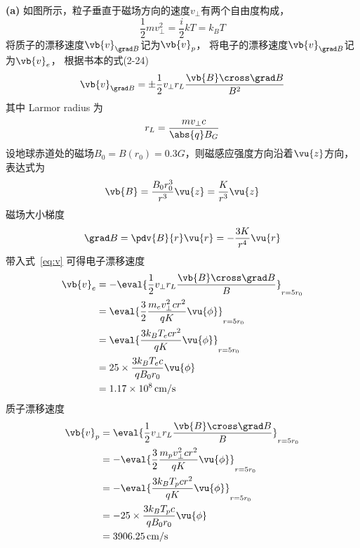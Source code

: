 \noindent \textbf{(a)} 
如图所示，粒子垂直于磁场方向的速度\(v_{\perp}\)有两个自由度构成，
\begin{equation}
  \frac{1}{2} m v_\perp^2 = \frac{i}{2}kT = k_BT
\end{equation}
将质子的漂移速度\(\vb{v}_{\grad B}\)记为\(\vb{v}_p\)，
将电子的漂移速度\(\vb{v}_{\grad B}\)记为\(\vb{v}_e\)，
根据书本的式(2-24)
\begin{equation}
  \vb{v}_{\grad B} = \pm \frac{1}{2} v_{\perp} r_L \frac{\vb{B} \cross \grad B}{B^2}
  \label{eq:v}
\end{equation}
其中 Larmor radius 为
\begin{equation}
  r_L = \frac{m v_\perp c}{\abs{q} B_G}
\end{equation}
设地球赤道处的磁场\(B_0 = B(r_0) = 0.3 \si{G}\)，则磁感应强度方向沿着\(\vu{z}\)方向，
表达式为
\begin{equation}
  \vb{B} = \frac{B_0 r_0^3}{r^3}  \vu{z}= \frac{K}{r^3} \vu{z}
\end{equation}
磁场大小梯度
\begin{equation}
  \grad B = \pdv{B}{r} \vu{r} = -\frac{3 K}{r^4} \vu{r}
\end{equation}
带入式~\eqref{eq:v} 可得电子漂移速度
\begin{equation}
  \begin{aligned}
    \vb{v}_e &= - \eval{\frac{1}{2} v_{\perp} r_L \frac{\vb{B} \cross \grad B}{B}}_{r=5r_0}\\
             &= \eval{\frac{3}{2} \frac{m_e v_\perp^2 cr^2}{q K}  \vu{\phi}}_{r=5 r_0} \\
             &= \eval{ \frac{3 k_B T_e cr^2}{q K}  \vu{\phi}}_{r=5 r_0} \\
             &= 25 \times \frac{3 k_B T_e c}{q B_0 r_0}  \vu{\phi} \\
             &= \SI{1.17e8}{cm / s}
  \end{aligned}
\end{equation}
质子漂移速度
\begin{equation}
  \begin{aligned}
    \vb{v}_p &= \eval{\frac{1}{2} v_{\perp} r_L \frac{\vb{B} \cross \grad B}{B}}_{r=5r_0}\\
             &= -\eval{\frac{3}{2} \frac{m_p v_\perp^2 c r^2 }{q K} \vu{\phi}}_{r=5 r_0} \\
             &= -\eval{\frac{3 k_B T_p c r^2 }{q K} \vu{\phi}}_{r=5 r_0} \\
             &= -25\times \frac{3 k_B T_p c }{q B_0 r_0} \vu{\phi} \\
             &= \SI{3906.25}{cm / s}
  \end{aligned}
\end{equation}

